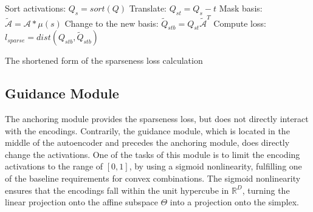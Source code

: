 			
			\begin{algorithm}[!ht]
				\SetAlgoLined
				\newcommand{\nosemic}{\SetEndCharOfAlgoLine{\relax}}   %
				\newcommand{\dosemic}{\SetEndCharOfAlgoLine{\string;}} %
				\newcommand{\pushline}{\Indp}                          %
				\newcommand{\popline}{\Indm\dosemic}                   %
				\let\oldnl\nl                                          %
				\newcommand{\nonl}{\renewcommand{\nl}{\let\nl\oldnl}}  %
				
				
				\nosemic\nonl \;
				
				\dosemic Sort activations: $Q_s = sort(Q)$\;
				Translate: $Q_{st} = Q_s - t$\;
				Mask basis: $\widetilde{\mathcal{A}} = \mathcal{A} * \mu(s)$\;
				Change to the new basis: $\widetilde{Q}_{stb} = Q_{st}\widetilde{\mathcal{A}}^T$\;					
				Compute loss: $l_{sparse} = dist(Q_{stb}, \widetilde{Q}_{stb})$\;
				
				\caption[Short-form sparseness loss in SCA]{The shortened form of the sparseness loss calculation}
				\label{alg:sparse_loss_short}
			\end{algorithm}
			
		\subsection{Guidance Module}
			
			The anchoring module provides the sparseness loss, but does not directly interact with the encodings.
			Contrarily, the guidance module, which is located in the middle of the autoencoder and precedes the anchoring module, does directly change the activations.
			One of the tasks of this module is to limit the encoding activations to the range of $[0, 1]$, by using a sigmoid nonlinearity, fulfilling one of the baseline requirements for convex combinations.
			The sigmoid nonlinearity ensures that the encodings fall within the unit hypercube in $\mathbb{R}^D$, turning the linear projection onto the affine subspace $\Theta$ into a projection onto the simplex.
			
